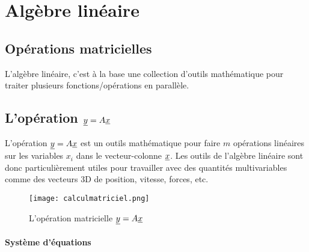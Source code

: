 \chapter{Algèbre linéaire}


\section{Opérations matricielles}
\label{sec:opmat}
L'algèbre linéaire, c'est à la base une collection d'outils mathématique pour traiter plusieurs fonctions/opérations en parallèle.

\section{L'opération $\underline{y} = A \underline{x}$}

 L'opération $\underline{y} = A \underline{x}$ est un outils mathématique pour faire $m$ opérations linéaires sur les variables $x_i$ dans le vecteur-colonne $\underline{x}$. Les outils de l'algèbre linéaire sont donc particulièrement utiles pour travailler avec des quantités multivariables comme des vecteurs 3D de position, vitesse, forces, etc.

\begin{figure}[htbp]
	\centering
		\texttt{[image: calculmatriciel.png]}
	\caption{L'opération matricielle $\underline{y} = A \underline{x}$}
	\label{fig:calculmatriciel}
\end{figure}

\subsubsection{Système d’équations}
\label{sec:syseq}

